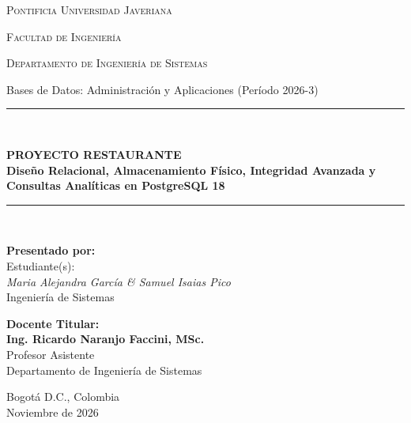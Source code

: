 \documentclass[11pt,letterpaper]{article}
\begin{document}
\begin{titlepage}
    \centering
    \vspace*{0.5cm}
    
    {\scshape\LARGE Pontificia Universidad Javeriana \par}
    \vspace{0.4cm}
    {\scshape\large Facultad de Ingeniería \par}
    {\scshape\large Departamento de Ingeniería de Sistemas \par}
    \vspace{0.3cm}
    {\large Bases de Datos: Administración y Aplicaciones (Período 2026-3) \par}
    
    \vspace{1.8cm}
    \rule{\linewidth}{1.5pt} \\[0.4cm]
    {\huge\bfseries\color{pujblue} PROYECTO RESTAURANTE \\[0.25cm] \large Diseño Relacional, Almacenamiento Físico, Integridad Avanzada y Consultas Analíticas en PostgreSQL 18 \par}
    \rule{\linewidth}{1.5pt} \\[1.8cm]
    
    \begin{minipage}[t]{0.48\textwidth}
        \textbf{Presentado por:} \\[0.2cm]
        Estudiante(s): \\
        \textit{Maria Alejandra García \& Samuel Isaias Pico} \\
        Ingeniería de Sistemas
    \end{minipage}
    \hfill
    \begin{minipage}[t]{0.48\textwidth}
        \raggedleft
        \textbf{Docente Titular:} \\[0.2cm]
        \textbf{Ing. Ricardo Naranjo Faccini, MSc.} \\
        Profesor Asistente \\
        Departamento de Ingeniería de Sistemas
    \end{minipage}
    
    \vfill
    {\large Bogotá D.C., Colombia \\ Noviembre de 2026 \par}
\end{titlepage}
\end{document}
